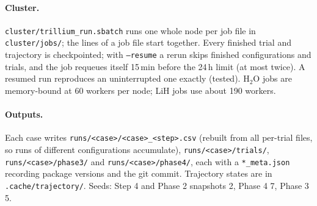 \documentclass[10.5pt]{article}
\newcommand{\code}[1]{\texttt{#1}}
\begin{document}
\paragraph{Cluster.}
\code{cluster/trillium\_run.sbatch} runs one whole node per job file in \code{cluster/jobs/}; the lines of a job file start together. Every finished trial and trajectory is checkpointed; with \code{--resume} a rerun skips finished configurations and trials, and the job requeues itself 15\,min before the 24\,h limit (at most twice). A resumed run reproduces an uninterrupted one exactly (tested). H$_2$O jobs are memory-bound at 60 workers per node; LiH jobs use about 190 workers.

\paragraph{Outputs.}
Each case writes \code{runs/<case>/<case>\_<step>.csv} (rebuilt from all per-trial files, so runs of different configurations accumulate), \code{runs/<case>/trials/}, \code{runs/<case>/phase3/} and \code{runs/<case>/phase4/}, each with a \code{*\_meta.json} recording package versions and the git commit. Trajectory states are in \code{.cache/trajectory/}. Seeds: Step 4 and Phase 2 snapshots 2, Phase 4 7, Phase 3 5.
\end{document}
